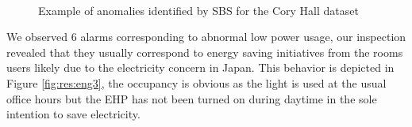 \begin{figure}[t]
   \hspace{.015\textwidth}
 \hspace{.015\textwidth}
 \\ 
\caption{Example of anomalies identified by SBS for the Cory Hall dataset}
\end{figure}

We observed 6 alarms corresponding to abnormal low power usage, our inspection revealed that they usually correspond to energy saving initiatives from the rooms users likely due to the electricity concern in Japan.
This behavior is depicted in Figure \ref{fig:res:eng3}, the occupancy is obvious as the light is used at the usual office hours but the EHP has not been turned on during daytime in the sole intention to save electricity.


